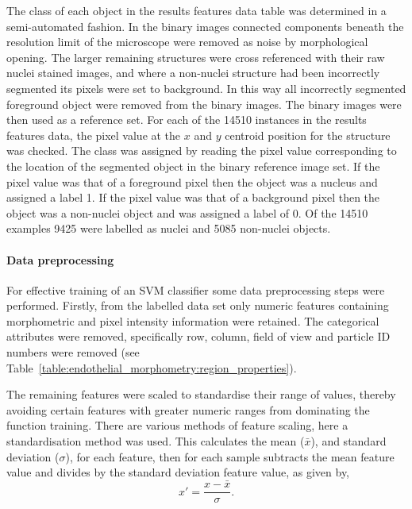 The class of each object in the results features data table was determined in a semi-automated fashion. In the binary images connected components beneath the resolution limit of the microscope were removed as noise by morphological opening. The larger remaining structures were cross referenced with their raw nuclei stained images, and where a non-nuclei structure had been incorrectly segmented its pixels were set to background. In this way all incorrectly segmented foreground object were removed from the binary images. The binary images were then used as a reference set. For each of the 14510 instances in the results features data, the pixel value at the $x$ and $y$ centroid position for the structure was checked. The class was assigned by reading the pixel value corresponding to the location of the segmented object in the binary reference image set. If the pixel value was that of a foreground pixel then the object was a nucleus and assigned a label 1. If the pixel value was that of a background pixel then the object was a non-nuclei object and was assigned a label of 0. Of the 14510 examples 9425 were labelled as nuclei and 5085 non-nuclei objects.

\paragraph{Data preprocessing}
For effective training of an SVM classifier some data preprocessing steps were performed. Firstly, from the labelled data set only numeric features containing morphometric and pixel intensity information were retained. The categorical attributes were removed, specifically row, column, field of view and particle ID numbers were removed (see Table~\ref{table:endothelial_morphometry:region_properties}).

The remaining features were scaled to standardise their range of values, thereby avoiding certain features with greater numeric ranges from dominating the function training. There are various methods of feature scaling, here a standardisation method was used. This calculates the mean ($\bar{x}$), and standard deviation ($\sigma$), for each feature, then for each sample subtracts the mean feature value and divides by the standard deviation feature value, as given by,
\begin{equation}
x'=\frac{x-\bar{x}}{\sigma}.
\end{equation}


